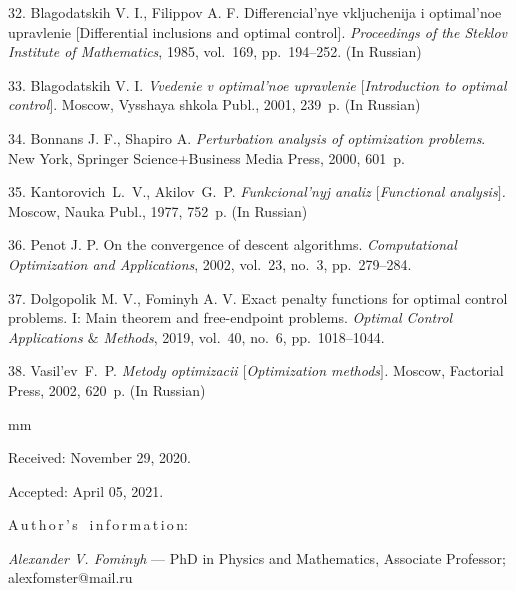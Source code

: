 {%
32. Blagodatskih V. I., Filippov A. F. Differencial'nye vkljuchenija i optimal'noe upravlenie [Dif\-fe\-ren\-tial inclusions and optimal control]. \emph{Proceedings of the Steklov Institute of Mathematics}, 1985, vol.~169, pp.~194--252. (In Russian)

33. Blagodatskih V. I. \emph{Vvedenie v optimal'noe upravlenie $[$Introduction to optimal control$]$}. Moscow, Vysshaya shkola Publ., 2001, 239~p. (In Russian)


34. Bonnans J. F., Shapiro A. \emph{Perturbation analysis of optimization problems}. New York, Springer Science+Business Media Press, 2000, 601~p.

35. Kantorovich~L.~V., Akilov~G.~P. \emph{ Funkcional'nyj analiz $[$Functional analysis$]$.} Moscow, Nauka Publ., 1977, 752~p. (In Russian)

36. Penot J. P. On the convergence of descent algorithms. \emph{Computational Optimization and Applications}, 2002, vol.~23, no.~3, pp.~279--284.

37. Dolgopolik M. V., Fominyh A. V. Exact penalty functions for optimal control problems. I: Main theorem and free-endpoint problems. \emph{Optimal Control Applications $\&$ Methods}, 2019, vol.~40, no.~6, pp.~1018--1044.




38. Vasil'ev~F.~P. \emph{Metody optimizacii $[$Optimization methods$]$.} Moscow, Factorial Press, 2002, 620~p. (In Russian)


mm

%


Received:  November 29, 2020.

Accepted: April 05, 2021.

\vskip 6mm


A\,u\,t\,h\,o\,r\,'\,s \ i\,n\,f\,o\,r\,m\,a\,t\,i\,o\,n:

\vskip 2mm \textit{Alexander V. Fominyh}  --- PhD in Physics and Mathematics, Associate Professor;\\ alexfomster@mail.ru \par
%
%
}

